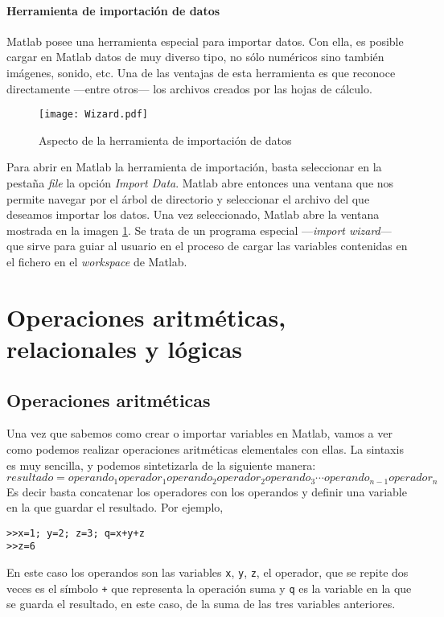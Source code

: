 \paragraph*{Herramienta de importación de datos}
Matlab posee una herramienta especial para importar datos. Con ella, es posible cargar en Matlab datos de muy diverso tipo, no sólo numéricos sino también imágenes, sonido, etc. Una de las ventajas de esta herramienta es que reconoce directamente ---entre otros--- los archivos creados por las hojas de cálculo.
\begin{figure}[h]
	\centering
		\texttt{[image: Wizard.pdf]}
	\caption{Aspecto de la herramienta de importación de datos}
	\label{fig:wizard}
\end{figure}

Para abrir en Matlab la herramienta de importación, basta seleccionar en la pestaña \emph{file} la opción \emph{Import Data}. Matlab abre entonces una ventana que nos permite navegar por el árbol de directorio y seleccionar el archivo del que deseamos importar los datos. Una vez seleccionado, Matlab abre la ventana mostrada en la imagen \ref{fig:wizard}. 
Se trata de un programa especial ---\emph{import wizard}--- que sirve para guiar al usuario en el proceso de cargar las variables contenidas en el fichero en el \emph{workspace} de Matlab.

\section{Operaciones aritméticas, relacionales y lógicas}

\subsection{Operaciones aritméticas}
 Una vez que sabemos como crear o importar variables en Matlab, vamos a ver como podemos realizar operaciones aritméticas elementales con ellas. La sintaxis es muy sencilla, y podemos sintetizarla de la siguiente manera:
\begin{equation*}
resultado=operando_1 operador_1 operando_2 operador_2 operando_3 \cdots operando_{n-1} operador_n
\end{equation*}
Es decir basta concatenar los operadores con los operandos y definir una variable en la que guardar el resultado. Por ejemplo,
\begin{verbatim}
>>x=1; y=2; z=3; q=x+y+z
>>z=6
\end{verbatim}
En este caso los operandos son las variables \texttt{x}, \texttt{y}, \texttt{z}, el operador, que se repite dos veces es el símbolo \texttt{+} que representa la operación suma y \texttt{q} es la variable en la que se guarda el resultado, en este caso, de la suma de las tres variables anteriores.

